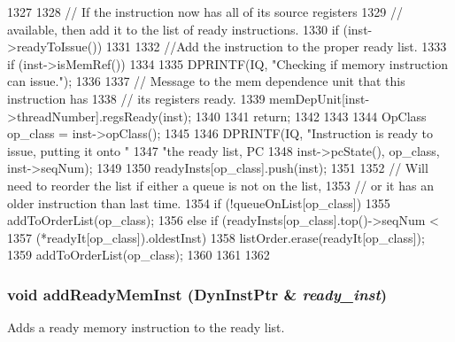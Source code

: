 \begin{DoxyCode}
1327 {
1328     // If the instruction now has all of its source registers
1329     // available, then add it to the list of ready instructions.
1330     if (inst->readyToIssue()) {
1331 
1332         //Add the instruction to the proper ready list.
1333         if (inst->isMemRef()) {
1334 
1335             DPRINTF(IQ, "Checking if memory instruction can issue.\n");
1336 
1337             // Message to the mem dependence unit that this instruction has
1338             // its registers ready.
1339             memDepUnit[inst->threadNumber].regsReady(inst);
1340 
1341             return;
1342         }
1343 
1344         OpClass op_class = inst->opClass();
1345 
1346         DPRINTF(IQ, "Instruction is ready to issue, putting it onto "
1347                 "the ready list, PC %
1348                 inst->pcState(), op_class, inst->seqNum);
1349 
1350         readyInsts[op_class].push(inst);
1351 
1352         // Will need to reorder the list if either a queue is not on the list,
1353         // or it has an older instruction than last time.
1354         if (!queueOnList[op_class]) {
1355             addToOrderList(op_class);
1356         } else if (readyInsts[op_class].top()->seqNum  <
1357                    (*readyIt[op_class]).oldestInst) {
1358             listOrder.erase(readyIt[op_class]);
1359             addToOrderList(op_class);
1360         }
1361     }
1362 }
\end{DoxyCode}
\hypertarget{classInstructionQueue_a76bcc078140b3e79923f7b5be8b302fb}{
\subsubsection[{addReadyMemInst}]{\setlength{\rightskip}{0pt plus 5cm}void addReadyMemInst ({\bf DynInstPtr} \& {\em ready\_\-inst})}}
\label{classInstructionQueue_a76bcc078140b3e79923f7b5be8b302fb}
Adds a ready memory instruction to the ready list. 


